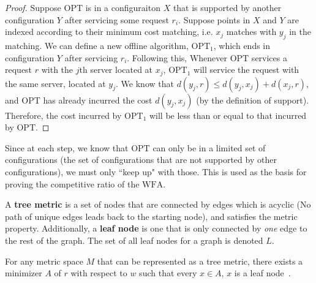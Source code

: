 \begin{proof}
    Suppose $\mathrm{OPT}$ is in a configuraiton $X$ that is supported by another configuration $Y$ after servicing some request $r_i$. Suppose points in $X$ and $Y$ are indexed according to their minimum cost matching, i.e. $x_j$ matches with $y_j$ in the matching. We can define a new offline algorithm, $\mathrm{OPT}_1$, which ends in configuration $Y$ after servicing $r_i$. Following this, Whenever $\mathrm{OPT}$ services a request $r$ with the $j$th server located at $x_j$, $\mathrm{OPT}_1$ will service the request with the same server, located at $y_j$. We know that $d(y_j, r) \leq d(y_j, x_j) + d(x_j, r)$, and $\mathrm{OPT}$ has already incurred the cost $d(y_j, x_j)$ (by the definition of support). Therefore, the cost incurred by $\mathrm{OPT}_1$ will be less than or equal to that incurred by $\mathrm{OPT}$.
\end{proof}

Since at each step, we know that $\mathrm{OPT}$ can only be in a limited set of configurations (the set of configurations that are not supported by other configurations), we must only ``keep up" with those. This is used as the basis for proving the competitive ratio of the $\mathrm{WFA}$.

\begin{definition}
    A \textbf{tree metric} is a set of nodes that are connected by edges which is acyclic (No path of unique edges leads back to the starting node), and satisfies the metric property. Additionally, a \textbf{leaf node} is one that is only connected by \textit{one} edge to the rest of the graph. The set of all leaf nodes for a graph is denoted $L$.
\end{definition}

\begin{lemma}
    \label{lem:leaf}
    For any metric space $M$ that can be represented as a tree metric, there exists a minimizer $A$ of $r$ with respect to $w$ such that every $x \in A$, $x$ is a leaf node~\cite{unifyingPotential2021}.
\end{lemma}

